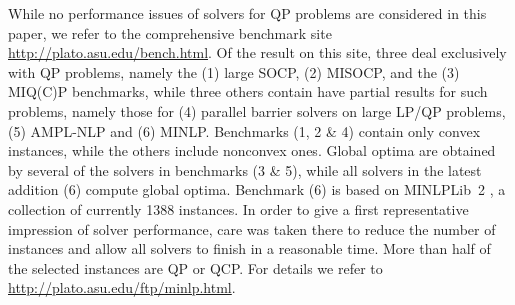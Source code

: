 While no performance issues of solvers for QP problems are considered in
this paper, we refer to the comprehensive benchmark site \url{http://plato.asu.edu/bench.html}. Of the result on this site, three deal exclusively with
QP problems, namely the (1) large SOCP, (2) MISOCP, and the (3) MIQ(C)P benchmarks, while three others contain have partial results for such problems,
namely those for (4) parallel barrier solvers on large LP/QP problems, (5) AMPL-NLP and (6) MINLP.
Benchmarks (1, 2 \& 4) contain only convex instances, while the others
include nonconvex ones. Global optima are obtained by several of the solvers in
benchmarks (3 \& 5), while all solvers in the latest addition (6) compute
global optima.
Benchmark (6) is based on MINLPLib~2 \cite{Vigerske2014}, a
collection of currently 1388 instances. In order to give a first representative
impression of solver performance, care was taken there to reduce the number of
instances and allow all solvers to finish in a reasonable time.
More than half of the selected instances are QP or QCP.
For details we refer to \url{http://plato.asu.edu/ftp/minlp.html}.


